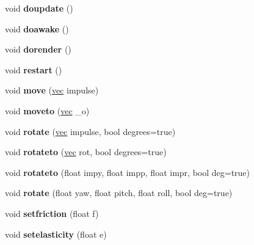 \begin{DoxyCompactItemize}
void {\bfseries doupdate} ()
\item 
\mbox{\label{structnode_a2f3a77f94099da69f90cd738a6547103}} 
void {\bfseries doawake} ()
\item 
\mbox{\label{structnode_a8538d33ed0ebc058658f0e95d4e481de}} 
void {\bfseries dorender} ()
\item 
\mbox{\label{structnode_aa49c2440ff2edcfed1dbc10e8b7dc5e2}} 
void {\bfseries restart} ()
\item 
\mbox{\label{structnode_a5f423e6e9b42ab470b0a2671d844a21c}} 
void {\bfseries move} (\hyperlink{structvec}{vec} impulse)
\item 
\mbox{\label{structnode_ae071d859a84cd0818de21a5129c5ea8b}} 
void {\bfseries moveto} (\hyperlink{structvec}{vec} \+\_\+o)
\item 
\mbox{\label{structnode_a8845adac42b77f4988ef42b616933da2}} 
void {\bfseries rotate} (\hyperlink{structvec}{vec} impulse, bool degrees=true)
\item 
\mbox{\label{structnode_a049a336f6b9007b27ea0273d8a9519e5}} 
void {\bfseries rotateto} (\hyperlink{structvec}{vec} rot, bool degrees=true)
\item 
\mbox{\label{structnode_a0ccc93db1ce7c01deb002c678160ec5b}} 
void {\bfseries rotateto} (float impy, float impp, float impr, bool deg=true)
\item 
\mbox{\label{structnode_a1ecbccc469d97954537588aa500f082c}} 
void {\bfseries rotate} (float yaw, float pitch, float roll, bool deg=true)
\item 
\mbox{\label{structnode_a2651688a2e839fb13e5538174f9152f6}} 
void {\bfseries setfriction} (float f)
\item 
\mbox{\label{structnode_a97270bdb13c6f54337de70ed4bbf53a5}} 
void {\bfseries setelasticity} (float e)
\item 
\mbox{\label{structnode_a066cdffdac5aa9cbdc58dc98c475ea8a}} 

\end{DoxyCompactItemize}
